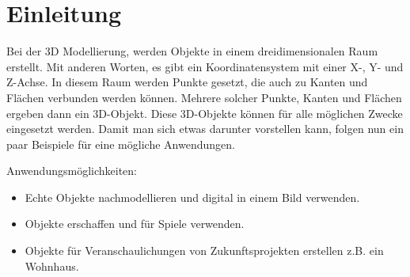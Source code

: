 \section{Einleitung}
Bei der 3D Modellierung, werden Objekte in einem dreidimensionalen Raum erstellt. Mit anderen Worten, es gibt ein Koordinatensystem mit einer X-, Y- und Z-Achse.
In diesem Raum werden Punkte gesetzt, die auch zu Kanten und Flächen verbunden werden können. Mehrere solcher Punkte, Kanten und Flächen ergeben dann ein 3D-Objekt.
Diese 3D-Objekte können für alle möglichen Zwecke eingesetzt werden. Damit man sich etwas darunter vorstellen kann, folgen nun ein paar Beispiele für
eine mögliche Anwendungen.

Anwendungsmöglichkeiten:
\begin{itemize}
    \item Echte Objekte nachmodellieren und digital in einem Bild verwenden.
    \item Objekte erschaffen und für Spiele verwenden.
    \item Objekte für Veranschaulichungen von Zukunftsprojekten erstellen z.B. ein Wohnhaus.
\end{itemize}
